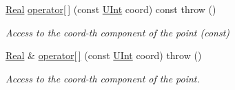 \begin{DoxyCompactItemize}
\hyperlink{namespaceFVCode3D_a40c1f5588a248569d80aa5f867080e83}{Real} \hyperlink{classFVCode3D_1_1Point3D_aac840a4571707984aab37f689b3d096c}{operator\mbox{[}$\,$\mbox{]}} (const \hyperlink{namespaceFVCode3D_a4bf7e328c75d0fd504050d040ebe9eda}{U\+Int} coord) const   throw ()
\begin{DoxyCompactList}\small\item\em Access to the coord-\/th component of the point (const) \end{DoxyCompactList}\item 
\hyperlink{namespaceFVCode3D_a40c1f5588a248569d80aa5f867080e83}{Real} \& \hyperlink{classFVCode3D_1_1Point3D_a66f607a43957db2e6922112d4cc4f286}{operator\mbox{[}$\,$\mbox{]}} (const \hyperlink{namespaceFVCode3D_a4bf7e328c75d0fd504050d040ebe9eda}{U\+Int} coord)  throw ()
\begin{DoxyCompactList}\small\item\em Access to the coord-\/th component of the point. \end{DoxyCompactList}\end{DoxyCompactItemize}
